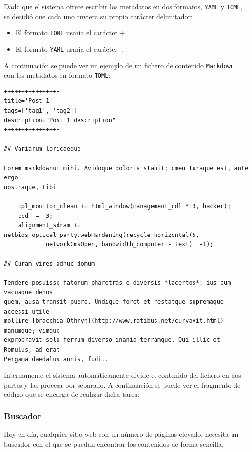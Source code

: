 \documentclass[a4paper,12pt]{article}
\begin{document}
Dado que el sistema ofrece escribir los metadatos en dos formatos, \texttt{YAML} y \texttt{TOML}, se decidió que cada
uno tuviera su propio carácter delimitador:

\begin{itemize}
    \item El formato \texttt{TOML} usaría el carácter +.
    \item El formato \texttt{YAML} usaría el carácter -.
\end{itemize}

A continuación se puede ver un ejemplo de un fichero de contenido \texttt{Markdown}~\cite{markdown} con los metadatos en formato
\texttt{TOML}:

\begin{verbatim}
++++++++++++++++
title='Post 1'
tags=['tag1', 'tag2']
description="Post 1 description"
++++++++++++++++

## Variarum loricaeque

Lorem markdownum mihi. Avidoque doloris stabit; omen turaque est, ante ergo
nostraque, tibi.

    cpl_monitor_clean += html_window(management_ddl * 3, hacker);
    ccd -= -3;
    alignment_sdram += netbios_optical_party.webHardening(recycle_horizontal(5,
            networkCmsOpen, bandwidth_computer - text), -1);

## Curam vires adhuc domum

Tendere posuisse fatorum pharetras e diversis *lacertos*: ius cum vacuaque denos
quem, ausa transit puero. Undique foret et restatque supremaque accessi utile
mollire [bracchia Othryn](http://www.ratibus.net/curvavit.html) manumque; vimque
exprobravit sola ferrum diverso inania terramque. Qui illic et Romulus, ad erat
Pergama daedalus annis, fudit.

\end{verbatim}

Internamente el sistema automáticamente divide el contenido del fichero en dos partes y las procesa por separado.
A continuación se puede ver el fragmento de código que se encarga de realizar dicha tarea:

\subsubsection{Buscador}

Hoy en día, cualquier sitio web con un número de páginas elevado, necesita un
buscador con el que se puedan encontrar los contenidos de forma sencilla.
\end{document}
